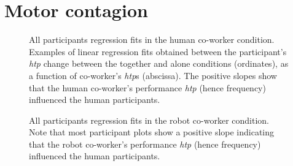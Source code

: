 \chapter{Motor contagion}


\begin{figure}[hpt]
	\caption{All participants regression fits in the human co-worker condition. Examples of linear regression fits obtained between the participant's {\it htp} change between the together and alone conditions (ordinates), as a function of co-worker's {\it htp}s (abscissa). The positive slopes show that the human co-worker's performance {\it htp} (hence frequency) influenced the human participants.}
	\label{S2_Fig}
\end{figure}


\begin{figure}
	\caption{All participants regression fits in the robot co-worker condition. Note that most participant plots show a positive slope indicating that the robot co-worker's performance {\it htp} (hence frequency) influenced the human participants.}
	\label{S1_Fig}
\end{figure}


